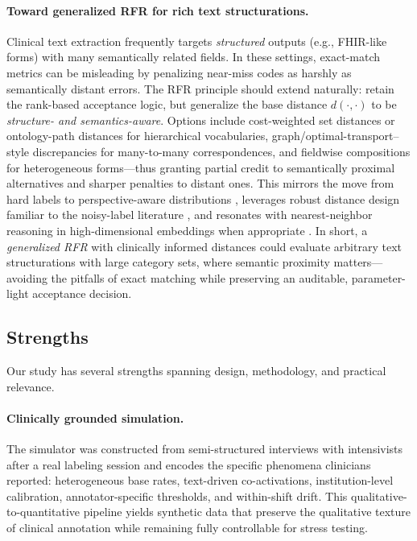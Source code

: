 \documentclass[12pt]{article}
\begin{document}
\paragraph{Toward generalized RFR for rich text structurations.}
Clinical text extraction frequently targets \emph{structured} outputs (e.g., FHIR-like forms) with many semantically related fields. In these settings, exact-match metrics can be misleading by penalizing near-miss codes as harshly as semantically distant errors. The RFR principle should extend naturally: retain the rank-based acceptance logic, but generalize the base distance $d(\cdot,\cdot)$ to be \emph{structure- and semantics-aware}. Options include cost-weighted set distances or ontology-path distances for hierarchical vocabularies, graph/optimal-transport–style discrepancies for many-to-many correspondences, and fieldwise compositions for heterogeneous forms—thus granting partial credit to semantically proximal alternatives and sharper penalties to distant ones. This mirrors the move from hard labels to perspective-aware distributions \cite{basile2021}, leverages robust distance design familiar to the noisy-label literature \cite{han2022,han2023,frenay2014}, and resonates with nearest-neighbor reasoning in high-dimensional embeddings when appropriate \cite{disalvo2024}. In short, a \emph{generalized RFR} with clinically informed distances could evaluate arbitrary text structurations with large category sets, where semantic proximity matters—avoiding the pitfalls of exact matching while preserving an auditable, parameter-light acceptance decision.



\subsection{Strengths}

Our study has several strengths spanning design, methodology, and practical relevance.

\paragraph{Clinically grounded simulation.}
The simulator was constructed from semi-structured interviews with intensivists after a real labeling session and encodes the specific phenomena clinicians reported: heterogeneous base rates, text-driven co-activations, institution-level calibration, annotator-specific thresholds, and within-shift drift. This qualitative-to-quantitative pipeline yields synthetic data that preserve the qualitative texture of clinical annotation while remaining fully controllable for stress testing.
\end{document}
